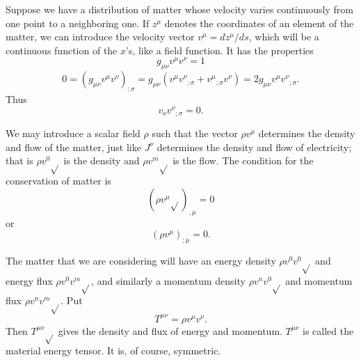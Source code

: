 Suppose we have a distribution of matter whose velocity varies continuously from one point to a neighboring one. If 
$z^\mu$ denotes the coordinates of an element of the matter, we can introduce the velocity vector $v^\mu = dz^\mu / d 
s$, which will be a continuous function of the $x$'s, like a field function. It has the properties
\begin{equation}
\label{ecuacion 25.1}
 g_{\mu\nu} v^\mu v^\nu = 1
\end{equation}
\[
0 = (g_{\mu\nu} v^\mu v^\nu)_{;\sigma} 
  = g_{\mu\nu}\left(v^\mu {v^\nu}_{;\sigma} + {v^\mu}_{;\sigma} v^\nu \right) = 2 g_{\mu\nu} v^\mu {v^\nu}_{;\sigma}.
\]
Thus
\begin{equation}
 \label{ecuacion 25.2}
 v_\nu {v^\nu}_{;\sigma} = 0.
\end{equation}

We may introduce a scalar field $\rho$ such that the vector $\rho v^\mu$ determines the density and flow of the matter, 
just like $J^\nu$ determines the density and flow of electricity; that is $\rho v^0 \sqrt{}$ is the density and $\rho 
v^m \sqrt{}$ is the flow. The condition for the conservation of matter is 
\[
\left( \rho v^\mu \sqrt{} \right)_{,\mu} = 0
\]
or
\begin{equation}
 \label{ecuacion 25.3}
 \left( \rho v^\mu \right)_{;\mu} = 0.
\end{equation}

The matter that we are considering will have an energy density $\rho v^0 v^0\sqrt{}$ and energy flux $\rho v^0 v^m 
\sqrt{}$, and similarly a momentum density $\rho v^n v^0 \sqrt{}$ and momentum flux $\rho v^n v^m \sqrt{}$. Put 
\begin{equation}
 \label{ecuacion 25.4}
 T^{\mu\nu} = \rho v^\mu v^\nu.
\end{equation}
Then $T^{\mu\nu}\sqrt{}$ gives the density and flux of energy and momentum. $T^{\mu\nu}$ is called the material energy 
tensor. It is, of course, symmetric.

